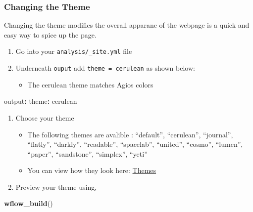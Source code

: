 \documentclass[]{book}
\newenvironment{Shaded}{\begin{snugshade}}{\end{snugshade}}
\newcommand{\KeywordTok}[1]{\textcolor[rgb]{0.13,0.29,0.53}{\textbf{#1}}}
\newcommand{\NormalTok}[1]{#1}
\newcommand{\OperatorTok}[1]{\textcolor[rgb]{0.81,0.36,0.00}{\textbf{#1}}}
\newcommand{\StringTok}[1]{\textcolor[rgb]{0.31,0.60,0.02}{#1}}
\providecommand{\tightlist}{%
  \setlength{\itemsep}{0pt}\setlength{\parskip}{0pt}}
\begin{document}
\hypertarget{changing-the-theme}{%
\subsubsection{Changing the Theme}\label{changing-the-theme}}

Changing the theme modifies the overall apparane of the webpage is a quick and easy way to spice up the page.

\begin{enumerate}
\def\labelenumi{\arabic{enumi}.}
\tightlist
\item
  Go into your \texttt{analysis/\_site.yml} file
\item
  Underneath \texttt{ouput} add \texttt{theme\ =\ cerulean} as shown below:

  \begin{itemize}
  \tightlist
  \item
    The cerulean theme matches Agios colors
  \end{itemize}
\end{enumerate}

\begin{Shaded}
\begin{Highlighting}[]
\NormalTok{output}\OperatorTok{:}
\StringTok{    }\NormalTok{theme}\OperatorTok{:}\StringTok{ }\NormalTok{cerulean}
\end{Highlighting}
\end{Shaded}

\begin{enumerate}
\def\labelenumi{\arabic{enumi}.}
\setcounter{enumi}{2}
\tightlist
\item
  Choose your theme

  \begin{itemize}
  \tightlist
  \item
    The following themes are avalible : ``default'', ``cerulean'', ``journal'', ``flatly'', ``darkly'', ``readable'', ``spacelab'', ``united'', ``cosmo'', ``lumen'', ``paper'', ``sandstone'', ``simplex'', ``yeti''
  \item
    You can view how they look here: \href{https://bootswatch.com/}{Themes}
  \end{itemize}
\item
  Preview your theme using,
\end{enumerate}

\begin{Shaded}
\begin{Highlighting}[]
\KeywordTok{wflow_build}\NormalTok{()}
\end{Highlighting}
\end{Shaded}
\end{document}
